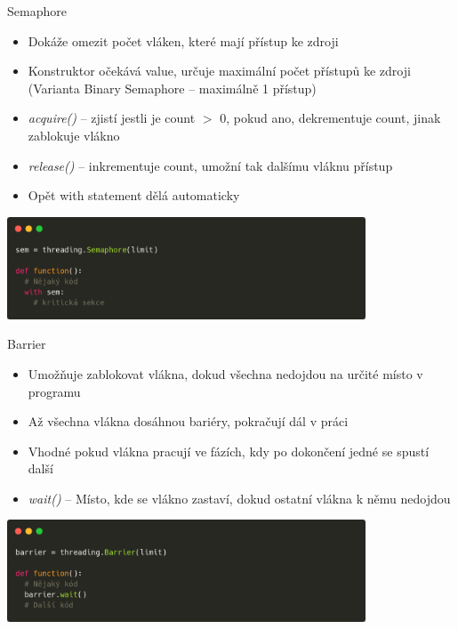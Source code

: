 \documentclass{beamer}
\begin{document}
\begin{frame}[fragile]{Semaphore}
    \begin{itemize}
        \item Dokáže omezit počet vláken, které mají přístup ke zdroji
        \item Konstruktor očekává value, určuje maximální počet přístupů ke zdroji
        \newline (Varianta Binary Semaphore – maximálně 1 přístup)

        \vskip 0.25in
        \item \textit{acquire()} – zjistí jestli je count $>$ 0, pokud ano, dekrementuje count, jinak zablokuje vlákno
        \item \textit{release()} – inkrementuje count, umožní tak dalšímu vláknu přístup
        \item Opět with statement dělá automaticky
    \end{itemize}
    \scriptsize
    \begin{center}
        \includegraphics[width=0.8\textwidth]{obrazky/codes/carbon3.png}
    \end{center}
\end{frame}

\begin{frame}[fragile]{Barrier}
    \begin{itemize}
        \item Umožňuje zablokovat vlákna, dokud všechna nedojdou na určité místo v programu
        \item Až všechna vlákna dosáhnou bariéry, pokračují dál v práci
        \item Vhodné pokud vlákna pracují ve fázích, kdy po dokončení jedné se spustí další

        \vskip 0.25in
        \item \textit{wait()} – Místo, kde se vlákno zastaví, dokud ostatní vlákna k němu nedojdou
    \end{itemize}
    \scriptsize

    \begin{center}
        \includegraphics[width=0.8\textwidth]{obrazky/codes/carbon4.png}
    \end{center}
\end{frame}
\end{document}
